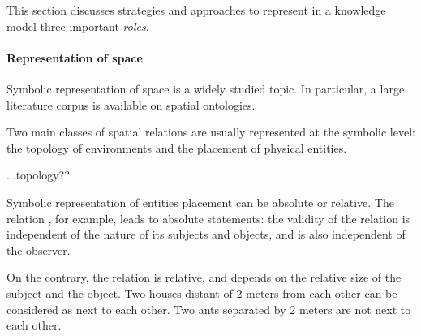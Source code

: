 This section discusses strategies and approaches to represent in a knowledge
model three important \emph{roles}.

\begin{scriptsize}
\begin{center}
\end{center}
\end{scriptsize}


\paragraph{Representation of space}

Symbolic representation of space is a widely studied topic. In particular, a
large literature corpus is available on spatial ontologies.

Two main classes of spatial relations are usually represented at the symbolic
level: the topology of environments and the placement of physical entities.

\begin{scriptsize}
\begin{center}
\end{center}
\end{scriptsize}

...topology??

Symbolic representation of entities placement can be absolute or relative. The
relation , for example, leads to absolute statements: the
validity of the relation is independent of the nature of its subjects and
objects, and is also independent of the observer.

On the contrary, the relation  is relative, and depends on the
relative size of the subject and the object. Two houses distant of 2 meters
from each other can be considered as next to each other. Two ants separated by
2 meters are not next to each other.

